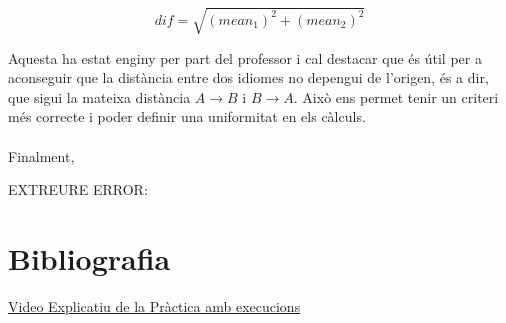\documentclass[conference]{IEEEtran}
\begin{document}
    $$dif=\sqrt{(mean_1)^2+(mean_2)^2}$$

    Aquesta ha estat enginy per part del professor i cal destacar que és útil per a aconseguir que la distància entre dos idiomes no depengui de l'origen, és a dir, que sigui la mateixa distància $A\rightarrow B$ i $B\rightarrow A$. Això ens permet tenir un criteri més correcte i poder definir una uniformitat en els càlculs.\\\\

    Finalment,



    EXTREURE ERROR:

\section{Bibliografia}

    
\href{https://youtu.be/fwJjpH5_WDg}{Video Explicatiu de la Pràctica amb execucions}
\end{document}
